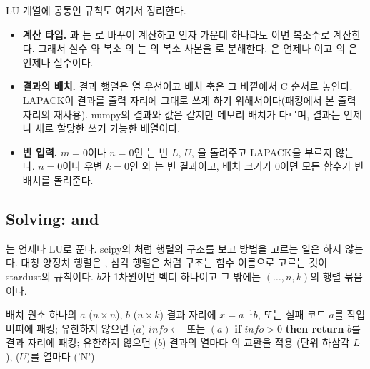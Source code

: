 LU 계열에 공통인 규칙도 여기서 정리한다.
\begin{itemize}
\item \textbf{계산 타입.} 과 는 로 바꾸어 계산하고 인자 가운데 하나라도 이면 복소수로 계산한다. 그래서 실수 와 복소 의 는 의 복소 사본을 로 분해한다. 은 언제나 이고 의 은 언제나 실수이다.
\item \textbf{결과의 배치.} 결과 행렬은 열 우선이고 배치 축은 그 바깥에서 C 순서로 놓인다. LAPACK이 결과를 출력 자리에 그대로 쓰게 하기 위해서이다(패킹에서 본 출력 자리의 재사용). numpy의 결과와 값은 같지만 메모리 배치가 다르며, 결과는 언제나 새로 할당한 쓰기 가능한 배열이다.
\item \textbf{빈 입력.} $m=0$이나 $n=0$인 는 빈 $L$, $U$, 을 돌려주고 LAPACK을 부르지 않는다. $n=0$이나 우변 $k=0$인 와 는 빈 결과이고, 배치 크기가 $0$이면 모든 함수가 빈 배치를 돌려준다.
\end{itemize}

\subsection{Solving: \texorpdfstring{}{solve} and \texorpdfstring{}{lu\_solve}}

는 언제나 LU로 푼다. scipy의 처럼 행렬의 구조를 보고 방법을 고르는 일은 하지 않는다. 대칭 양정치 행렬은 , 삼각 행렬은 처럼 구조는 함수 이름으로 고르는 것이 stardust의 규칙이다. $b$가 1차원이면 벡터 하나이고 그 밖에는 $(\dots,n,k)$의 행렬 묶음이다.

\begin{algorithm}[t]
\begin{algorithmic}[1]
\Require 배치 원소 하나의 $a$ ($n\times n$), $b$ ($n\times k$)
\Ensure 결과 자리에 $x=a^{-1}b$, 또는 실패 코드
\State $a$를 작업 버퍼에 패킹; 유한하지 않으면 \Return {}($a$)
\State $\mathit{info}\gets$  또는 $(a)$ 
\State \textbf{if} $\mathit{info}>0$ \textbf{then return} 
\State $b$를 결과 자리에 패킹; 유한하지 않으면 \Return {}($b$)
  \State 결과의 열마다 의 교환을 적용
  \State {}(단위 하삼각 $L$), ($U$)를 열마다
\Else
  \State {}('N') 
\EndIf
\end{algorithmic}
\caption{의 배치 원소 하나}
\label{alg:lu-solve-body}
\end{algorithm}

